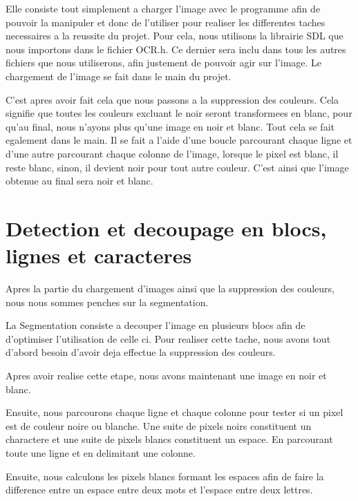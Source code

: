 \documentclass[a4paper, 12pt]{report}
\begin{document}
	
	Elle consiste tout simplement a charger l'image avec le programme afin de pouvoir la manipuler et donc de l'utiliser pour realiser les differentes taches necessaires a la reussite du projet. Pour cela, nous utilisons la librairie SDL que nous importons dans le fichier OCR.h. Ce dernier sera inclu dans tous les autres fichiers que nous utiliserons, afin justement de pouvoir agir sur l'image. 
	Le chargement de l'image se fait dans le main du projet. \newline
	
	
	C'est apres avoir fait cela que nous passons a la suppression des couleurs. Cela signifie que toutes les couleurs excluant le noir seront transformees en blanc, pour qu'au final, nous n'ayons plus qu'une image en noir et blanc. Tout cela se fait egalement dans le main. Il se fait a l'aide d'une boucle parcourant chaque ligne et d'une autre parcourant chaque colonne de l'image, lorsque le pixel est blanc, il reste blanc, sinon, il devient noir pour tout autre couleur. C'est ainsi que l'image obtenue au final sera noir et blanc. \\ \newpage
	
	\section{Detection et decoupage en blocs, lignes et caracteres}
	
	\Large
	
	Apres la partie du chargement d'images ainsi que la suppression des couleurs, nous nous sommes penches sur la segmentation. \newline
	
	
	La Segmentation consiste a decouper l'image en plusieurs blocs afin de d'optimiser l'utilisation de celle ci. Pour realiser cette tache, nous avons tout d'abord besoin d'avoir deja effectue la suppression des couleurs. \newline
	
	
	 Apres avoir realise cette etape, nous avons maintenant une image en noir et blanc. \newline
	 
	 
	 Ensuite, nous parcourons chaque ligne et chaque colonne pour tester si un pixel est de couleur noire ou blanche. Une suite de pixels noirs constituent un charactere et une suite de pixels blancs constituent un espace. En parcourant toute une ligne et en delimitant une colonne. \newline
	 
	 
	 Ensuite, nous calculons les pixels blancs formant les espaces afin de faire la difference entre un espace entre deux mots et l'espace entre deux lettres. \newline
	 
\end{document}
